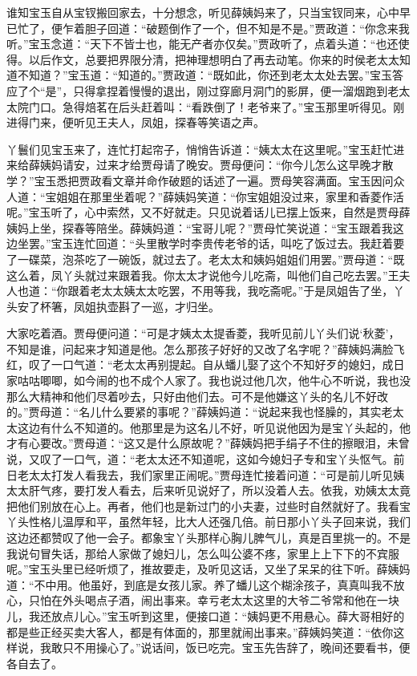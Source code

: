 \begin{parag}
\end{parag}


\begin{parag}
    谁知宝玉自从宝钗搬回家去，十分想念，听见薛姨妈来了，只当宝钗同来，心中早已忙了，便乍着胆子回道：“破题倒作了一个，但不知是不是。”贾政道：“你念来我听。”宝玉念道：“天下不皆士也，能无产者亦仅矣。”贾政听了，点着头道：“也还使得。以后作文，总要把界限分清，把神理想明白了再去动笔。你来的时侯老太太知道不知道？”宝玉道：“知道的。”贾政道：“既如此，你还到老太太处去罢。”宝玉答应了个“是”，只得拿捏着慢慢的退出，刚过穿廊月洞门的影屏，便一溜烟跑到老太太院门口。急得焙茗在后头赶着叫：“看跌倒了！老爷来了。”宝玉那里听得见。刚进得门来，便听见王夫人，凤姐，探春等笑语之声。
\end{parag}


\begin{parag}
    丫鬟们见宝玉来了，连忙打起帘子，悄悄告诉道：“姨太太在这里呢。”宝玉赶忙进来给薛姨妈请安，过来才给贾母请了晚安。贾母便问：“你今儿怎么这早晚才散学？”宝玉悉把贾政看文章并命作破题的话述了一遍。贾母笑容满面。宝玉因问众人道：“宝姐姐在那里坐着呢？”薛姨妈笑道：“你宝姐姐没过来，家里和香菱作活呢。”宝玉听了，心中索然，又不好就走。只见说着话儿已摆上饭来，自然是贾母薛姨妈上坐，探春等陪坐。薛姨妈道：“宝哥儿呢？”贾母忙笑说道：“宝玉跟着我这边坐罢。”宝玉连忙回道：“头里散学时李贵传老爷的话，叫吃了饭过去。我赶着要了一碟菜，泡茶吃了一碗饭，就过去了。老太太和姨妈姐姐们用罢。”贾母道：“既这么着，凤丫头就过来跟着我。你太太才说他今儿吃斋，叫他们自己吃去罢。”王夫人也道：“你跟着老太太姨太太吃罢，不用等我，我吃斋呢。”于是凤姐告了坐，丫头安了杯箸，凤姐执壶斟了一巡，才归坐。
\end{parag}


\begin{parag}
    大家吃着酒。贾母便问道：“可是才姨太太提香菱，我听见前儿丫头们说‘秋菱’，不知是谁，问起来才知道是他。怎么那孩子好好的又改了名字呢？”薛姨妈满脸飞红，叹了一口气道：“老太太再别提起。自从蟠儿娶了这个不知好歹的媳妇，成日家咕咕唧唧，如今闹的也不成个人家了。我也说过他几次，他牛心不听说，我也没那么大精神和他们尽着吵去，只好由他们去。可不是他嫌这丫头的名儿不好改的。”贾母道：“名儿什么要紧的事呢？”薛姨妈道：“说起来我也怪臊的，其实老太太这边有什么不知道的。他那里是为这名儿不好，听见说他因为是宝丫头起的，他才有心要改。”贾母道：“这又是什么原故呢？”薛姨妈把手绢子不住的擦眼泪，未曾说，又叹了一口气，道：“老太太还不知道呢，这如今媳妇子专和宝丫头怄气。前日老太太打发人看我去，我们家里正闹呢。”贾母连忙接着问道：“可是前儿听见姨太太肝气疼，要打发人看去，后来听见说好了，所以没着人去。依我，劝姨太太竟把他们别放在心上。再者，他们也是新过门的小夫妻，过些时自然就好了。我看宝丫头性格儿温厚和平，虽然年轻，比大人还强几倍。前日那小丫头子回来说，我们这边还都赞叹了他一会子。都象宝丫头那样心胸儿脾气儿，真是百里挑一的。不是我说句冒失话，那给人家做了媳妇儿，怎么叫公婆不疼，家里上上下下的不宾服呢。”宝玉头里已经听烦了，推故要走，及听见这话，又坐了呆呆的往下听。薛姨妈道：“不中用。他虽好，到底是女孩儿家。养了蟠儿这个糊涂孩子，真真叫我不放心，只怕在外头喝点子酒，闹出事来。幸亏老太太这里的大爷二爷常和他在一块儿，我还放点儿心。”宝玉听到这里，便接口道：“姨妈更不用悬心。薛大哥相好的都是些正经买卖大客人，都是有体面的，那里就闹出事来。”薛姨妈笑道：“依你这样说，我敢只不用操心了。”说话间，饭已吃完。宝玉先告辞了，晚间还要看书，便各自去了。
\end{parag}


